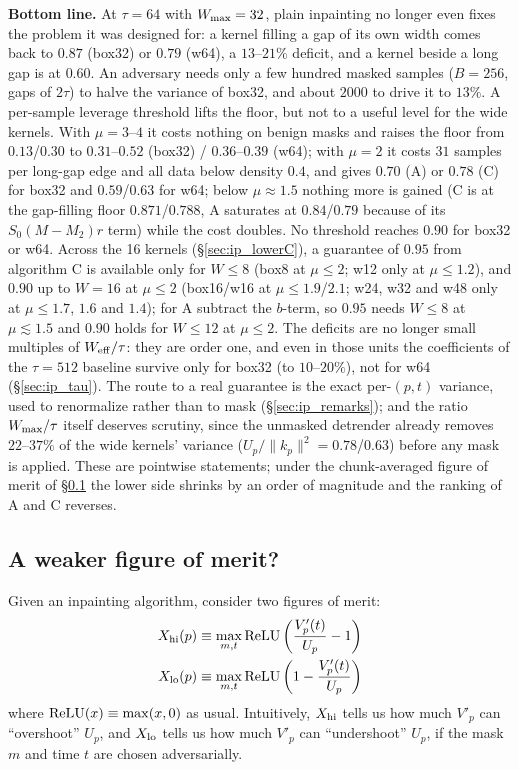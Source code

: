 \documentclass{article}
\numberwithin{equation}{section}   %
\def\nn{\nonumber}
\begin{document}
{\bf Bottom line.}  At $\tau = 64$ with $W_{\rm max} = 32$, plain inpainting no longer even fixes the
problem it was designed for: a kernel filling a gap of its own width comes back to $0.87$ (box32) or
$0.79$ (w64), a $13$--$21\%$ deficit, and a kernel beside a long gap is at $0.60$.  An adversary needs only
a few hundred masked samples ($B = 256$, gaps of $2\tau$) to halve the variance of box32, and about
$2000$ to drive it to $13\%$.  A per-sample leverage threshold lifts the floor, but not to a useful
level for the wide kernels.  With $\mu = 3$--$4$ it costs nothing on benign masks and raises the floor
from $0.13$/$0.30$ to $0.31$--$0.52$ (box32) / $0.36$--$0.39$ (w64); with $\mu = 2$ it costs $31$ samples
per long-gap edge and all data below density $0.4$, and gives $0.70$ (A) or $0.78$ (C) for box32 and
$0.59$/$0.63$ for w64; below $\mu \approx 1.5$ nothing more is gained (C is at the gap-filling floor
$0.871$/$0.788$, A saturates at $0.84$/$0.79$ because of its $S_0(M-M_2)r$ term) while the cost doubles.
No threshold reaches $0.90$ for box32 or w64.  Across the 16 kernels (\S\ref{sec:ip_lowerC}), a
guarantee of $0.95$ from algorithm C is available only for $W \le 8$ (box8 at $\mu \le 2$; w12 only at
$\mu \le 1.2$), and $0.90$ up to $W = 16$ at $\mu \le 2$ (box16/w16 at $\mu \le 1.9$/$2.1$; w24, w32 and
w48 only at $\mu \le 1.7$, $1.6$ and $1.4$); for A subtract the $b$-term, so $0.95$ needs $W \le 8$ at
$\mu \lesssim 1.5$ and $0.90$ holds for $W \le 12$ at $\mu \le 2$.  The deficits are no longer small
multiples of $W_{\rm eff}/\tau$: they are order one, and even in those units the coefficients of the
$\tau = 512$ baseline survive only for box32 (to $10$--$20\%$), not for w64 (\S\ref{sec:ip_tau}).  The
route to a real guarantee is the exact per-$(p,t)$ variance, used to renormalize rather than to mask
(\S\ref{sec:ip_remarks}); and the ratio $W_{\rm max}/\tau$ itself deserves scrutiny, since the unmasked
detrender already removes $22$--$37\%$ of the wide kernels' variance ($U_p/\|k_p\|^2 = 0.78$/$0.63$)
before any mask is applied.  These are pointwise statements; under the chunk-averaged figure of merit of
\S\ref{ssec:weaker_fom} the lower side shrinks by an order of magnitude and the ranking of A and C reverses.

\subsection{A weaker figure of merit?}
\label{ssec:weaker_fom}

Given an inpainting algorithm, consider two figures of merit:
\begin{align}
X_{\rm hi}(p) &\equiv \max_{m,t} \mbox{ReLU} \left( \frac{V'_p(t)}{U_p} - 1 \right) \nn \\
X_{\rm lo}(p) &\equiv \max_{m,t} \mbox{ReLU} \left( 1 -  \frac{V'_p(t)}{U_p} \right)
\label{eq:Xhl_def}
\end{align}
where ${\rm ReLU}(x) \equiv \max(x,0)$ as usual.
Intuitively, $X_{\rm hi}$ tells us how much $V'_p$ can ``overshoot'' $U_p$, and $X_{\rm lo}$ tells us how much $V'_p$ can ``undershoot'' $U_p$, if the mask $m$ and time $t$ are chosen adversarially.
\end{document}
